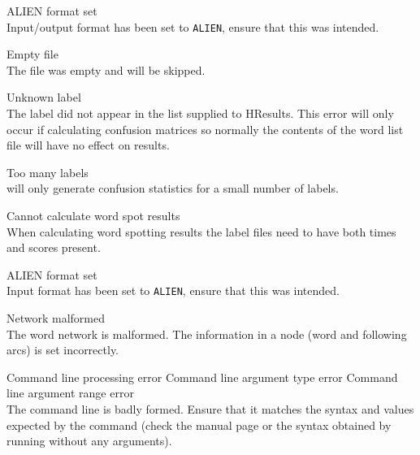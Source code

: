 \begin{itemize}
\begin{itemize}
    ALIEN format set\\
        Input/output format has been set to \texttt{ALIEN}, ensure that 
        this was intended.

\end{itemize}


\begin{itemize}
    Empty file\\
        The file was empty and will be skipped.

    Unknown label\\
        The label did not appear in the list supplied to HResults.
        This error will only occur if calculating confusion matrices so 
        normally the contents of the word list file will have no effect 
        on results.

    Too many labels\\
         will only generate confusion statistics for a small 
        number of labels.

 Cannot calculate word spot results\\
        When calculating word spotting results the label files need to have 
        both times and scores present.

    ALIEN format set\\
        Input format has been set to \texttt{ALIEN}, ensure that this was 
        intended.

\end{itemize}


\begin{itemize}
    Network malformed\\
        The word network is malformed. The information in a node (word
        and following arcs) is set incorrectly.

\end{itemize}


\begin{itemize}
    Command line processing error
    Command line argument type error
    Command line argument range error\\
        The command line is badly formed.  Ensure that it matches the 
        syntax and values expected by the command (check the manual 
        page or the syntax obtained by running  without any
        arguments).


\end{itemize}
\end{itemize}
